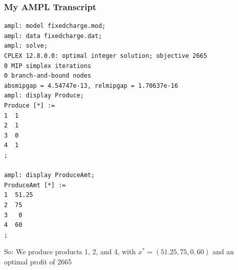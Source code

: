 \begin{frame}[fragile]

	\frametitle{My AMPL Transcript}
	
	
\begin{lstlisting}
ampl: model fixedcharge.mod;
ampl: data fixedcharge.dat;
ampl: solve;
CPLEX 12.8.0.0: optimal integer solution; objective 2665
0 MIP simplex iterations
0 branch-and-bound nodes
absmipgap = 4.54747e-13, relmipgap = 1.70637e-16
ampl: display Produce;
Produce [*] :=
1  1
2  1
3  0
4  1
;

ampl: display ProduceAmt;
ProduceAmt [*] :=
1  51.25
2  75
3   0
4  60
;
\end{lstlisting}

	\bit
	\item So: We produce products 1, 2, and 4, with $x^* = (51.25,75,0,60)$ and an optimal profit of 2665
	\eit

\end{frame}




